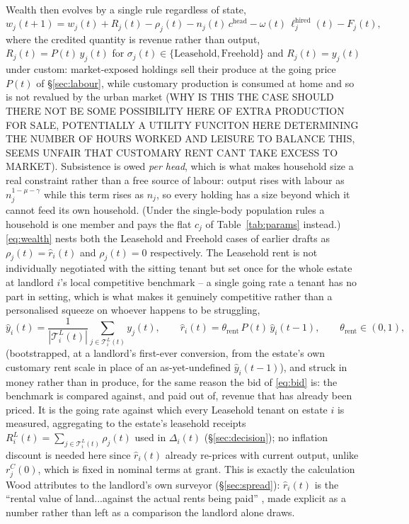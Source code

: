 \documentclass[11pt,english]{article}
\begin{document}
Wealth then evolves by a single rule regardless of state,
\begin{equation}
w_j(t+1) = w_j(t) + R_j(t) - \rho_j(t) - n_j(t)\,c^{\text{head}} - \omega(t)\,\ell_j^{\text{hired}}(t) - F_j(t),
\label{eq:wealth}
\end{equation}
where the credited quantity is revenue rather than output, $R_j(t)=P(t)\,y_j(t)$ for $\sigma_j(t)\in\{\text{Leasehold},\text{Freehold}\}$ and $R_j(t)=y_j(t)$ under custom: market-exposed holdings sell their produce at the going price $P(t)$ of \S\ref{sec:labour}, while customary production is consumed at home and so is not revalued by the urban market (WHY IS THIS THE CASE SHOULD THERE NOT BE SOME POSSIBILITY HERE OF EXTRA PRODUCTION FOR SALE, POTENTIALLY A UTILITY FUNCITON HERE DETERMINING THE NUMBER OF HOURS WORKED AND LEISURE TO BALANCE THIS, SEEMS UNFAIR THAT CUSTOMARY RENT CANT TAKE EXCESS TO MARKET). Subsistence is owed \emph{per head}, which is what makes household size a real constraint rather than a free source of labour: output rises with labour as $n_j^{1-\mu-\gamma}$ while this term rises as $n_j$, so every holding has a size beyond which it cannot feed its own household. (Under the single-body population rules a household is one member and pays the flat $c_j$ of Table~\ref{tab:params} instead.) \eqref{eq:wealth} nests both the Leasehold and Freehold cases of earlier drafts as $\rho_j(t)=\hat r_i(t)$ and $\rho_j(t)=0$ respectively. The Leasehold rent is not individually negotiated with the sitting tenant but set once for the whole estate at landlord $i$'s local competitive benchmark -- a single going rate a tenant has no part in setting, which is what makes it genuinely competitive rather than a personalised squeeze on whoever happens to be struggling,
\begin{equation}
\hat y_i(t) = \frac{1}{|\mathcal{T}_i^{L}(t)|}\sum_{j\in\mathcal{T}_i^{L}(t)} y_j(t), \qquad
\hat r_i(t) = \theta_{\text{rent}}\,P(t)\,\hat y_i(t-1), \qquad \theta_{\text{rent}}\in(0,1),
\end{equation}
(bootstrapped, at a landlord's first-ever conversion, from the estate's own customary rent scale in place of an as-yet-undefined $\hat y_i(t-1)$), and struck in money rather than in produce, for the same reason the bid of \eqref{eq:bid} is: the benchmark is compared against, and paid out of, revenue that has already been priced. It is the going rate against which every Leasehold tenant on estate $i$ is measured, aggregating to the estate's leasehold receipts $R_i^{L}(t)=\sum_{j\in\mathcal{T}_i^{L}(t)}\rho_j(t)$ used in $\Delta_i(t)$ (\S\ref{sec:decision}); no inflation discount is needed here since $\hat r_i(t)$ already re-prices with current output, unlike $r_j^{C}(0)$, which is fixed in nominal terms at grant. This is exactly the calculation Wood attributes to the landlord's own surveyor (\S\ref{sec:spread}): $\hat r_i(t)$ is the ``rental value of land...against the actual rents being paid'' \cite[p.101]{wood2002origin}, made explicit as a number rather than left as a comparison the landlord alone draws.
\end{document}
